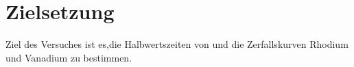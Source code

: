 \section{Zielsetzung}
\label{sec:zielsetzung}

Ziel des Versuches ist es,die Halbwertszeiten von und die Zerfallskurven Rhodium und Vanadium zu bestimmen.